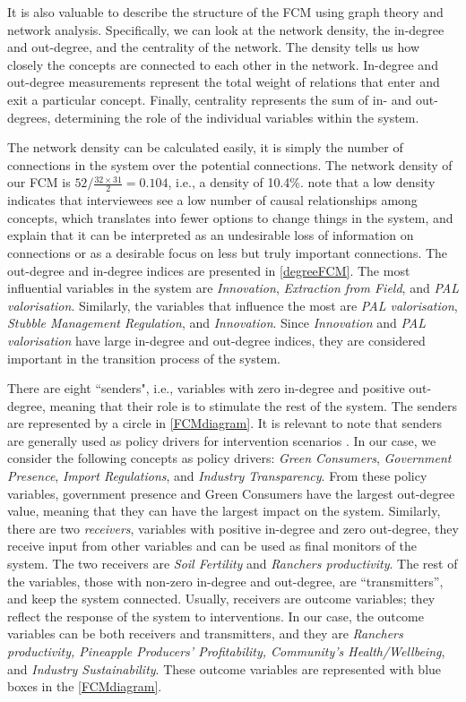 It is also valuable to describe the structure of the FCM using graph theory and network analysis. Specifically, we can look at the network density, the in-degree and out-degree, and the centrality of the network. The density tells us how closely the concepts are connected to each other in the network. In-degree and out-degree measurements represent the total weight of relations that enter and exit a particular concept. Finally, centrality represents the sum of in- and out-degrees, determining the role of the individual variables within the system.

The network density can be calculated easily, it is simply the number of connections in the system over the potential connections. The network density of our FCM is $52/\frac{32\times31}{2}=0.104$, i.e.,  a density of 10.4\%. \cite{ozesmi2004ecological} note that a low density indicates that interviewees see a low number of causal relationships among concepts, which translates into fewer options to change things in the system, and \cite{jetter2014fuzzy} explain that it can be interpreted as an undesirable loss of information on connections or as a desirable focus on less but truly important connections. The out-degree and in-degree indices are presented in \cref{degreeFCM}. The most influential variables in the system are \textit{Innovation}, \textit{Extraction from Field}, and \textit{PAL valorisation}. Similarly, the variables that influence the most are \textit{PAL valorisation}, \textit{Stubble Management Regulation}, and \textit{Innovation}. Since \textit{Innovation} and \textit{PAL valorisation} have large in-degree and out-degree indices, they are considered important in the transition process of the system.  

There are eight ``senders", i.e., variables with zero in-degree and positive out-degree, meaning that their role is to stimulate the rest of the system. The senders are represented by a circle in \cref{FCMdiagram}. It is relevant to note that senders are generally used as policy drivers for intervention scenarios \citep{morone2021using}.  In our case, we consider the following concepts as policy drivers: \textit{Green Consumers}, \textit{Government Presence}, \textit{Import Regulations}, and \textit{Industry Transparency}. From these policy variables, government presence and Green Consumers have the largest out-degree value, meaning that they can have the largest impact on the system. Similarly, there are two \textit{receivers}, variables with positive in-degree and zero out-degree, they receive input from other variables and can be used as final monitors of the system. The two receivers are \textit{Soil Fertility} and \textit{Ranchers productivity}. The rest of the variables, those with non-zero in-degree and out-degree, are “transmitters”, and keep the system connected. Usually, receivers are outcome variables; they reflect the response of the system to interventions. In our case, the outcome variables can be both receivers and transmitters, and they are \textit{Ranchers productivity, Pineapple Producers' Profitability, Community's Health/Wellbeing}, and \textit{Industry Sustainability}. These outcome variables are represented with blue boxes in the \cref{FCMdiagram}.


